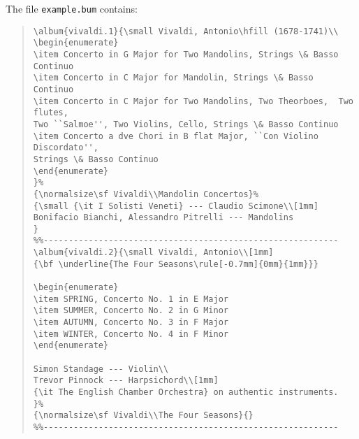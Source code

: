 \noindent The file {\tt example.bum} contains:
\begin{quote}
\begin{verbatim}
\album{vivaldi.1}{\small Vivaldi, Antonio\hfill (1678-1741)\\
\begin{enumerate}
\item Concerto in G Major for Two Mandolins, Strings \& Basso Continuo
\item Concerto in C Major for Mandolin, Strings \& Basso Continuo
\item Concerto in C Major for Two Mandolins, Two Theorboes,  Two flutes,
Two ``Salmoe'', Two Violins, Cello, Strings \& Basso Continuo
\item Concerto a dve Chori in B flat Major, ``Con Violino Discordato'',
Strings \& Basso Continuo
\end{enumerate}
}%
{\normalsize\sf Vivaldi\\Mandolin Concertos}%
{\small {\it I Solisti Veneti} --- Claudio Scimone\\[1mm]
Bonifacio Bianchi, Alessandro Pitrelli --- Mandolins
}
%%-----------------------------------------------------------
\album{vivaldi.2}{\small Vivaldi, Antonio\\[1mm]
{\bf \underline{The Four Seasons\rule[-0.7mm]{0mm}{1mm}}}

\begin{enumerate}
\item SPRING, Concerto No. 1 in E Major
\item SUMMER, Concerto No. 2 in G Minor
\item AUTUMN, Concerto No. 3 in F Major
\item WINTER, Concerto No. 4 in F Minor
\end{enumerate}

Simon Standage --- Violin\\
Trevor Pinnock --- Harpsichord\\[1mm]
{\it The English Chamber Orchestra} on authentic instruments.
}%
{\normalsize\sf Vivaldi\\The Four Seasons}{}
%%-----------------------------------------------------------
\end{verbatim}
\end{quote}


